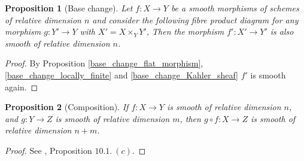 \documentclass{article}
\theoremstyle{plain}
\newtheorem{theorem}{Theorem}[subsection]
\newtheorem{proposition}[theorem]{Proposition}
\theoremstyle{definition}
\begin{document}

\begin{proposition}[Base change]
\label{base_change_smooth}
    Let $f:X\rightarrow Y$ be a smooth morphisms of schemes of relative dimension $n$ and consider the following fibre product diagram for any morphism $g:Y'\rightarrow Y$ with $X'=X\times_Y Y'$, 
    Then the morphism $f': X'\rightarrow Y'$ is also smooth of relative dimension $n$.
\end{proposition}
\begin{proof}
    By Proposition \ref{base_change_flat_morphism}, \ref{base_change_locally_finite} and \ref{base_change_Kahler_sheaf} $f'$ is smooth again.
\end{proof}

\begin{proposition}[Composition]
\label{composition_smooth}
    If $f:X\rightarrow Y$ is smooth of relative dimension $n$, and $g:Y\rightarrow Z$ is smooth of relative dimension $m$, then $g\circ f :X\rightarrow Z$ is smooth of relative dimension $n+m$.
\end{proposition}
\begin{proof}
    See \cite{Hartshorne}, Proposition $10.1.\: (c)$.
\end{proof}
\end{document}
